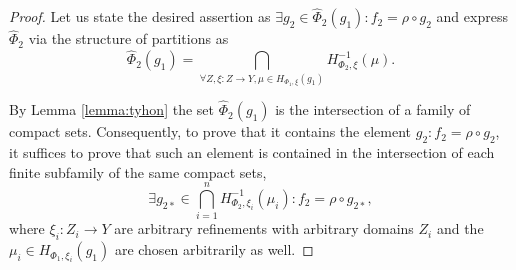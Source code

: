 \begin{proof}
	Let us state the desired assertion as $\exists g_2 \in \widehat{\Phi}_2(g_1) : f_2 = \rho \circ g_2$ and express $\widehat{\Phi}_2$ via the structure of partitions as %
	\begin{equation*}%
		\widehat{\Phi}_2(g_1) = \bigcap_{\forall Z, \xi : Z \rightarrow Y, \mu \in H_{\Phi_1,\xi}(g_1)} H_{\Phi_2,\xi}^{-1}(\mu).
	\end{equation*}
	
	By Lemma \ref{lemma:tyhon} the set $\widehat{\Phi}_2(g_1)$ is the intersection of a family of compact sets. Consequently, to prove that it contains the element $g_2 : f_2 = \rho \circ g_2$, it suffices to prove that such an element is contained in the intersection of each finite subfamily of the same compact sets, %
	\begin{equation*}%
		\exists g_{2*} \in \bigcap_{i=1}^n H_{\Phi_2,\xi_i}^{-1}(\mu_i) : f_2 = \rho \circ g_{2*},
	\end{equation*}
	where $\xi_i : Z_i \rightarrow Y$ are arbitrary refinements with arbitrary domains $Z_i$ and the $\mu_i \in H_{\Phi_1,\xi_i}(g_1)$ are chosen arbitrarily as well. %
	

\end{proof}
